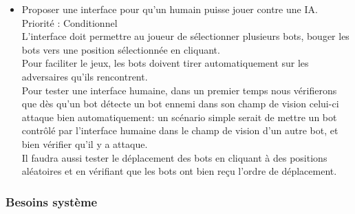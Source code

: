 \documentclass[french]{article}
\begin{document}
\begin{itemize}
            
        \item Proposer une interface pour qu'un humain puisse jouer contre une IA. \\
            Priorité : Conditionnel \\
            L'interface doit permettre au joueur de sélectionner plusieurs bots, bouger les bots vers une position sélectionnée en cliquant. \\
            Pour faciliter le jeux, les bots doivent tirer automatiquement sur les adversaires qu'ils rencontrent. \\
            Pour tester une interface humaine, dans un premier temps nous vérifierons que dès qu'un bot détecte un bot ennemi dans son champ de vision celui-ci attaque bien automatiquement: un scénario simple serait de mettre un bot contrôlé par l'interface humaine dans le champ de vision d'un autre bot, et bien vérifier qu'il y a attaque.\\
            Il faudra aussi tester le déplacement des bots en cliquant à des positions aléatoires et en vérifiant que les bots ont bien reçu l'ordre de déplacement. \\ 

    \end{itemize}

\subsubsection{Besoins système}
    
\end{document}
